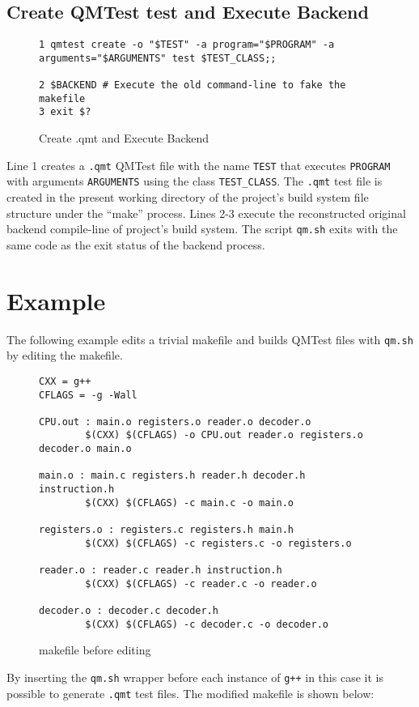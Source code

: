 \subsection{Create QMTest test and Execute Backend}

\begin{figure}[!ht]
{\scriptsize
\begin{verbatim}
1 qmtest create -o "$TEST" -a program="$PROGRAM" -a arguments="$ARGUMENTS" test $TEST_CLASS;;
                                                                                
2 $BACKEND # Execute the old command-line to fake the makefile
3 exit $?
\end{verbatim}
}
\caption{Create .qmt and Execute Backend}
\end{figure}

Line 1 creates a {\tt .qmt} QMTest file with the name {\tt TEST} that executes
{\tt PROGRAM} with arguments {\tt ARGUMENTS} using the class {\tt TEST\_CLASS}.
The {\tt .qmt} test file is created in the present working directory of the
project's build system file structure under the ``make'' process.
Lines 2-3 execute the reconstructed original backend compile-line of project's
build system. The script {\tt qm.sh} exits with the same code as the exit
status of the backend process.

\section{Example}

The following example edits a trivial makefile and builds QMTest files with
{\tt qm.sh} by editing the makefile.

\begin{figure}[!ht]
{\scriptsize
\begin{verbatim}
CXX = g++
CFLAGS = -g -Wall

CPU.out : main.o registers.o reader.o decoder.o
        $(CXX) $(CFLAGS) -o CPU.out reader.o registers.o decoder.o main.o
                                                                                
main.o : main.c registers.h reader.h decoder.h instruction.h
        $(CXX) $(CFLAGS) -c main.c -o main.o
                                                                                
registers.o : registers.c registers.h main.h
        $(CXX) $(CFLAGS) -c registers.c -o registers.o
                                                                                
reader.o : reader.c reader.h instruction.h
        $(CXX) $(CFLAGS) -c reader.c -o reader.o
                                                                                
decoder.o : decoder.c decoder.h
        $(CXX) $(CFLAGS) -c decoder.c -o decoder.o
\end{verbatim}
}
\caption{makefile before editing}
\end{figure}
By inserting the {\tt qm.sh} wrapper before each instance of {\tt g++} in this
case it is possible to generate {\tt .qmt} test files. The modified makefile is
shown below:

